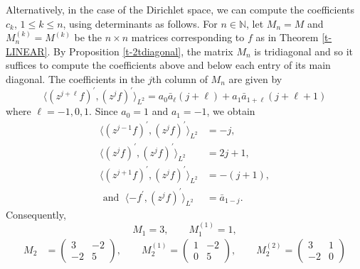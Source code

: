 \documentclass[11 pt,reqno]{amsart}
\theoremstyle{definition}
\theoremstyle{remark}
\numberwithin{equation}{section} \numberwithin{figure}{section}
\newcommand{\NN}{{\mathbb N}}
\begin{document}
Alternatively, in the case of the Dirichlet space, we can compute the coefficients $c_k$, $1\leq k \leq n$, using determinants as follows.
For $n\in\NN$,
      let $M_{n}=M$ and $M^{(k)}_{n}=M^{(k)}$ be the $n\times n$ matrices corresponding
      to $f$ as in Theorem \ref{t-LINEAR}.  By Proposition \ref{t-2tdiagonal}, the
      matrix $M_{n}$ is tridiagonal and so it suffices to compute the coefficients
      above and below each entry of its main diagonal.  The
      coefficients in the $j$th column of $M_{n}$ are given by
      \[  \langle (z^{j+\ell} f)^{\prime},(z^{j}f)^{\prime}\rangle_{L^{2}}
              =a_{0}\bar{a}_{\ell}(j+\ell)+a_{1}\bar{a}_{1+\ell}(j+\ell+1)    \]
      where $\ell=-1,0,1$.  Since $a_0=1$ and $a_1=-1$, we obtain
      \begin{align*}
                  \langle (z^{j-1} f)^{\prime},(z^{j}f)^{\prime}\rangle_{L^{2}}
                  &=-j,\\
                  \langle (z^{j} f)^{\prime},(z^{j}f)^{\prime}\rangle_{L^{2}}
                  &=2j+1,\\
                  \langle (z^{j+1} f)^{\prime},(z^{j}f)^{\prime}\rangle_{L^{2}}
                  &=-(j+1),\\
                  \text{ and }\;\langle -f^{\prime},(z^{j}f)^{\prime}\rangle_{L^{2}}
                  &=\bar{a}_{1-j}.
      \end{align*}
      Consequently,
      \[  M_{1}=3,\qquad M_{1}^{(1)}=1,   \]
      \begin{align*}
                  M_{2}&=\left(
                  \begin{array}{cc}
                              3       &   -2\\
                              -2  &   5
                  \end{array}\right),\qquad
                  M_{2}^{(1)}=\left(
                  \begin{array}{cc}
                              1       &   -2\\
                              0       &   5
                  \end{array}\right),\qquad
                  M_{2}^{(2)}=\left(
                  \begin{array}{cc}
                              3       &   1\\
                              -2  &   0
                  \end{array}\right)
      \end{align*}
\end{document}
